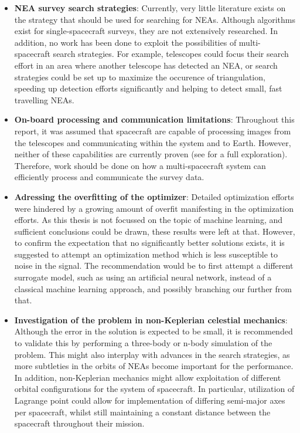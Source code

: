 \begin{itemize}
 \item \textbf{NEA survey search strategies}: Currently, very little literature exists on the strategy that should be used for searching for NEAs. Although algorithms exist for single-spacecraft surveys, they are not extensively researched. In addition, no work has been done to exploit the possibilities of multi-spacecraft search strategies. For example, telescopes could focus their search effort in an area where another telescope has detected an NEA, or search strategies could be set up to maximize the occurence of triangulation, speeding up detection efforts significantly and helping to detect small, fast travelling NEAs.
 \item \textbf{On-board processing and communication limitations}: Throughout this report, it was assumed that spacecraft are capable of processing images from the telescopes and communicating within the system and to Earth. However, neither of these capabilities are currently proven (see \cite{LiteratureReview} for a full exploration). Therefore, work should be done on how a multi-spacecraft system can efficiently process and communicate the survey data.
 \item \textbf{Adressing the overfitting of the optimizer}: Detailed optimization efforts were hindered by a growing amount of overfit manifesting in the optimization efforts. As this thesis is not focussed on the topic of machine learning, and sufficient conclusions could be drawn, these results were left at that. However, to confirm the expectation that no significantly better solutions exists, it is suggested to attempt an optimization method which is less susceptible to noise in the signal. The recommendation would be to first attempt a different surrogate model, such as using an artificial neural network, instead of a classical machine learning approach, and possibly branching our further from that.
 \item \textbf{Investigation of the problem in non-Keplerian celestial mechanics}: Although the error in the solution is expected to be small, it is recommended to validate this by performing a three-body or n-body simulation of the problem. This might also interplay with advances in the search strategies, as more subtleties in the orbits of NEAs become important for the performance. In addition, non-Keplerian mechanics might allow exploitation of different orbital configurations for the system of spacecraft. In particular, utilization of Lagrange point could allow for implementation of differing semi-major axes per spacecraft, whilst still maintaining a constant distance between the spacecraft throughout their mission.
\end{itemize}
